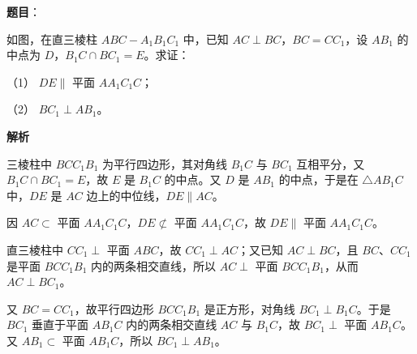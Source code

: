 \begin{answer}

\textbf{题目}：

如图，在直三棱柱 \(ABC-A_{1}B_{1}C_{1}\) 中，已知 \(AC\perp BC\)，\(BC=CC_{1}\)，设 \(AB_{1}\) 的中点为 \(D\)，\(B_{1}C\cap BC_{1}=E\)。求证：

（1） \(DE\parallel\) 平面 \(AA_{1}C_{1}C\)；

（2） \(BC_{1}\perp AB_{1}\)。
\nopagebreak[4]
\begin{center}\end{center}
\nopagebreak[4]
\textbf{解析}


三棱柱中 \(BCC_{1}B_{1}\) 为平行四边形，其对角线 \(B_{1}C\) 与 \(BC_{1}\) 互相平分，又 \(B_{1}C\cap BC_{1}=E\)，故 \(E\) 是 \(B_{1}C\) 的中点。又 \(D\) 是 \(AB_{1}\) 的中点，于是在 \(\triangle AB_{1}C\) 中，\(DE\) 是 \(AC\) 边上的中位线，\(DE\parallel AC\)。

因 \(AC\subset\) 平面 \(AA_{1}C_{1}C\)，\(DE\not\subset\) 平面 \(AA_{1}C_{1}C\)，故 \(DE\parallel\) 平面 \(AA_{1}C_{1}C\)。


直三棱柱中 \(CC_{1}\perp\) 平面 \(ABC\)，故 \(CC_{1}\perp AC\)；又已知 \(AC\perp BC\)，且 \(BC\)、\(CC_{1}\) 是平面 \(BCC_{1}B_{1}\) 内的两条相交直线，所以 \(AC\perp\) 平面 \(BCC_{1}B_{1}\)，从而 \(AC\perp BC_{1}\)。

又 \(BC=CC_{1}\)，故平行四边形 \(BCC_{1}B_{1}\) 是正方形，对角线 \(BC_{1}\perp B_{1}C\)。于是 \(BC_{1}\) 垂直于平面 \(AB_{1}C\) 内的两条相交直线 \(AC\) 与 \(B_{1}C\)，故 \(BC_{1}\perp\) 平面 \(AB_{1}C\)。又 \(AB_{1}\subset\) 平面 \(AB_{1}C\)，所以 \(BC_{1}\perp AB_{1}\)。



\end{answer}
